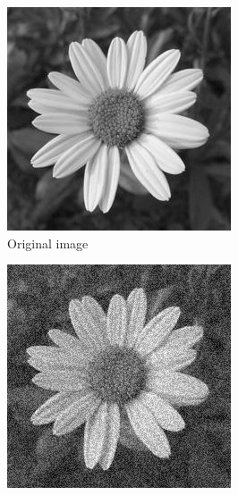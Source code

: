 \begin{figure}[H]
    \centering
    \begin{subfigure}[b]{0.32\textwidth}
        \includegraphics[width=\textwidth]{img/flowerOriginal.png}
        \caption{Original image}
    \end{subfigure}
    \begin{subfigure}[b]{0.32\textwidth}
        \includegraphics[width=\textwidth]{img/flowerNoisy.png}

\end{subfigure}
\end{figure}

